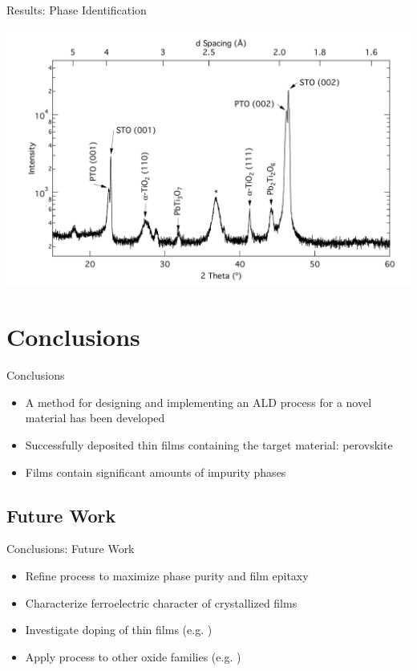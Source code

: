 \documentclass[professionalfont]{beamer}
\begin{document}
\begin{frame}{Results: Phase Identification}
\begin{overprint}
\begin{center}
		\centerline{\includegraphics[width=\textwidth]{./graphics/data/xrd/28STO}}
		\end{center}
\end{overprint}
\end{frame}


\section{Conclusions}

\begin{frame}{Conclusions}

\begin{itemize}
\item A method for designing and implementing an ALD process for a novel material has been developed
\vspace{1.5em}
\item Successfully deposited thin films containing the target material: perovskite 
\vspace{1.5em}
\item Films contain significant amounts of impurity phases
\end{itemize}
\end{frame}

\subsection{Future Work}
\begin{frame}{Conclusions: Future Work}
\begin{itemize}
\item Refine process to maximize phase purity and film epitaxy
\vspace{2em}
\item Characterize ferroelectric character of crystallized films
\vspace{2em}
\item Investigate doping of thin films (e.g. )
\vspace{2em}
\item Apply process to other oxide families (e.g. )
\end{itemize}
\end{frame}
\end{document}
